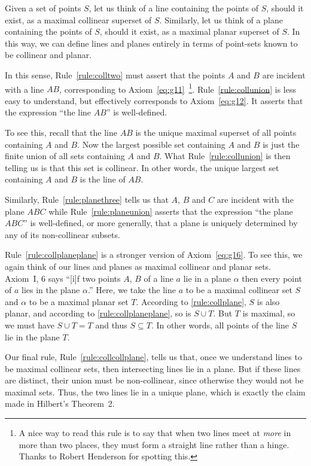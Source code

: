 Given a set of points $S$, let us think of a line containing the points of $S$, should it exist, as a maximal collinear superset of $S$. Similarly, let us think of a plane containing the points of $S$, should it exist, as a maximal planar superset of $S$. In this way, we can define lines and planes entirely in terms of point-sets known to be collinear and planar. 

In this sense, Rule~\ref{rule:colltwo} must assert that the points $A$ and $B$ are incident with a line $AB$, corresponding to Axiom~\ref{eq:g11}~\footnote{A nice way to read this rule is to say that when two lines meet at \emph{more} in more than two places, they must form a straight line rather than a hinge. Thanks to Robert Henderson for spotting this.}. Rule~\ref{rule:collunion} is less easy to understand, but effectively corresponds to Axiom~\ref{eq:g12}. It asserts that the expression ``the line $AB$'' is well-defined.

To see this, recall that the line $AB$ is the unique maximal superset of all points containing $A$ and $B$. Now the largest possible set containing $A$ and $B$ is just the finite union of all sets containing $A$ and $B$. What Rule~\ref{rule:collunion} is then telling us is that this set is collinear. In other words, the unique largest set containing $A$ and $B$ is the line of $AB$.

Similarly, Rule~\ref{rule:planethree} tells us that $A$, $B$ and $C$ are incident with the plane $ABC$ while Rule~\ref{rule:planeunion} asserts that the expression ``the plane $ABC$'' is well-defined, or more generally, that a plane is uniquely determined by any of its non-collinear subsets.

Rule~\ref{rule:collplaneplane} is a stronger version of Axiom~\ref{eq:g16}. To see this, we again think of our lines and planes as maximal collinear and planar sets. Axiom~I, 6 says ``[i]f two points $A$, $B$ of a line $a$ lie in a plane $\alpha$ then every point of $a$ lies in the plane $\alpha$.'' Here, we take the line $a$ to be a maximal collinear set $S$ and $\alpha$ to be a maximal planar set $T$. According to \ref{rule:collplane}, $S$ is also planar, and according to \ref{rule:collplaneplane}, so is $S \cup T$. But $T$ is maximal, so we must have $S \cup T = T$ and thus $S \subseteq T$. In other words, all points of the line $S$ lie in the plane $T$.

Our final rule, Rule~\ref{rule:collcollplane}, tells us that, once we understand lines to be maximal collinear sets, then intersecting lines lie in a plane. But if these lines are distinct, their union must be non-collinear, since otherwise they would not be maximal sets. Thus, the two lines lie in a unique plane, which is exactly the claim made in Hilbert's Theorem~2. 

